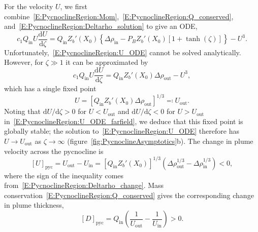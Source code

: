 \documentclass[openacc]{rsproca_new}%
\newcommand{\dd}[2]{\frac{\mathrm{d} #1}{\mathrm{d} #2}}
\newcommand{\Pb}{\textit{P}_B}  %
\newcommand{\cone}{c_1}  %
\renewcommand{\in}{\text{in}} %
\newcommand{\out}{\text{out}}
\begin{document}
For the velocity $U$, we first combine~\eqref{E:PycnoclineRegion:Mom},~\eqref{E:PycnoclineRegion:Q_conserved}, and~\eqref{E:PycnoclineRegion:Deltarho_solution} to give an ODE, 
\begin{equation}\label{E:PycnoclineRegion:U_ODE}
\cone Q_\in U \dd{U}{\zeta} = Q_\in Z_b'(X_0)\left\{\Delta \rho_\in - \Pb Z_b'(X_0) \left[1 + \tanh(\zeta)\right]\right\} - U^3.
\end{equation}
Unfortunately,~\eqref{E:PycnoclineRegion:U_ODE} cannot be solved analytically. However, for $\zeta \gg 1$ it can be approximated by
\begin{equation}\label{E:PycnoclineRegion:U_ODE_farfield}
\cone Q_\in U \dd{U}{\zeta} = Q_\in Z_b'(X_0)\Delta \rho_\out - U^3,
\end{equation}
which has a single fixed point 
\begin{equation}\label{E:PycnoclineRegion:U_Limit}
U = \left[ Q_\in Z_b'(X_0)\Delta \rho_\out\right]^{1/3}  \eqcolon U_\out.
\end{equation}
Noting that $\mathrm{d}U/\mathrm{d}\zeta > 0$  for $U < U_\out$ and $\mathrm{d}U/\mathrm{d}\zeta < 0$  for $U > U_\out$ in~\eqref{E:PycnoclineRegion:U_ODE_farfield}, we deduce that this fixed point is globally stable; the solution to~\eqref{E:PycnoclineRegion:U_ODE} therefore has $U \to U_\out$ as $\zeta \to \infty$ (figure~\ref{fig:PycnoclineAsymptotics}b). The change in plume velocity across the pycnocline is
\begin{equation}\label{E:PycnoclineRegion:U_change}
\left[U\right]_{\text{pyc}} = U_\out - U_\in = \left[Q_\in Z_b'(X_0)\right]^{1/3} \left(\Delta \rho_\out^{1/3} - \Delta \rho_\in^{1/3}\right) < 0,
\end{equation}
where the sign of the inequality comes from~\eqref{E:PycnoclineRegion:Deltarho_change}. Mass conservation~\eqref{E:PycnoclineRegion:Q_conserved} gives the corresponding change in plume thickness,
\begin{equation}\label{E:PycnoclineRegion:D_change}
\left[D\right]_{\text{pyc}} = Q_\in \left(\frac{1}{U_\out} - \frac{1}{U_\in}\right) > 0.
\end{equation}
\end{document}

